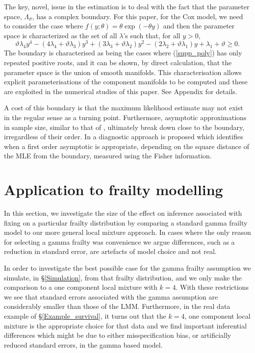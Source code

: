 \documentclass[graybox]{svmult}
\begin{document}
The key, novel, issue in the estimation is to deal with the fact that the parameter space, $\Lambda_{\vartheta}$, has a complex boundary. For this paper, for the Cox model,  we need to  consider the case where $f(y;\theta) =\theta\exp(-\theta y)$ and then the  parameter space is characterized as the set of all 
$\lambda$'s such that, for all $y>0$,
\begin{equation}\label{supp_poly}
\vartheta \lambda_4 y^4-(4 \lambda_4+\vartheta \lambda_3) y^3+(3\lambda_3 + \vartheta \lambda_2)y^2-(2 \lambda_2+\vartheta \lambda_1) y+ \lambda_1+\vartheta \ge 0.
\end{equation}
The boundary is characterised as being the cases where  (\ref{supp_poly}) has  only repeated positive roots, and it can be shown, by direct calculation, that the parameter space is the union of smooth manifolds.   This characterisation allows explicit parameterisations of the component manifolds to be computed and these are exploited in the numerical studies of this paper. See Appendix for details. 

{ A cost of this boundary is that the maximum likelihood estimate may not exist in the regular sense as a turning point.  Furthermore, asymptotic approximations in sample size, similar to that of \cite{Zucker2008}, ultimately break down close to the boundary, irregardless of their order. In \cite{Anaya-Izquierdo2013a}  a diagnostic approach is proposed which   identifies when a first order asymptotic is appropriate, depending on the square distance of the MLE from the boundary, measured using the Fisher information. }


\section{Application to frailty modelling}\label{Application to frailty modelling}

In this section, we investigate the size of the effect on inference associated with fixing on a particular frailty
distribution by comparing a standard gamma frailty model to our more general local mixture approach.  In cases where
the only reason for selecting a gamma frailty was convenience  we argue differences, such as a reduction in standard
error, are artefacts of  model choice and not real. 

 In order to investigate the best possible case for the gamma
frailty assumption we simulate, in \S \ref{Simulation}, from that frailty distribution, and we only make the comparison
to  a one component  local mixture with $k=4$. With these restrictions we see that standard errors associated with
the gamma assumption are considerably smaller than those of the LMM.   Furthermore, in  the real data example of \S \ref{Example_survival},
it turns out that the $k=4$, one component  local mixture is the appropriate choice for that data and   we find important
inferential differences which might be due to either  misspecification   bias,  or artificially reduced standard errors,
in the gamma based model. 
\end{document}
